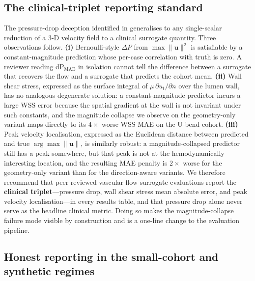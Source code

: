 \documentclass[10pt,a4paper]{article}
\begin{document}
\subsection*{The clinical-triplet reporting standard}
\label{sec:triplet}

The pressure-drop deception identified in 
generalises to any single-scalar reduction of a 3-D velocity field
to a clinical surrogate quantity. Three observations follow.
\textbf{(i)} Bernoulli-style $\Delta P$ from $\max\|\mathbf{u}\|^{2}$
is satisfiable by a constant-magnitude prediction whose per-case
correlation with truth is zero. A reviewer reading dP$_\mathrm{MAE}$
in isolation cannot tell the difference between a surrogate that
recovers the flow and a surrogate that predicts the cohort mean.
\textbf{(ii)} Wall shear stress, expressed as the surface integral of
$\mu\,\partial u_t/\partial n$ over the lumen wall, has no analogous
degenerate solution: a constant-magnitude predictor incurs a large
WSS error because the spatial gradient at the wall is not invariant
under such constants, and the magnitude collapse we observe on the
geometry-only variant maps directly to its $4\times$ worse WSS MAE
on the U-bend cohort. \textbf{(iii)} Peak velocity localisation,
expressed as the Euclidean distance between predicted and true
$\arg\max\|\mathbf{u}\|$, is similarly robust: a magnitude-collapsed
predictor still has a peak somewhere, but that peak is not at the
hemodynamically interesting location, and the resulting MAE penalty
is $2\times$ worse for the geometry-only variant than for the
direction-aware variants. We therefore recommend that
peer-reviewed vascular-flow surrogate evaluations report the
\textbf{clinical triplet}---pressure drop, wall shear stress mean
absolute error, and peak velocity localisation---in every results
table, and that pressure drop alone never serve as the headline
clinical metric. Doing so makes the magnitude-collapse failure mode
visible by construction and is a one-line change to the evaluation
pipeline.

\subsection*{Honest reporting in the small-cohort and synthetic regimes}
\end{document}
